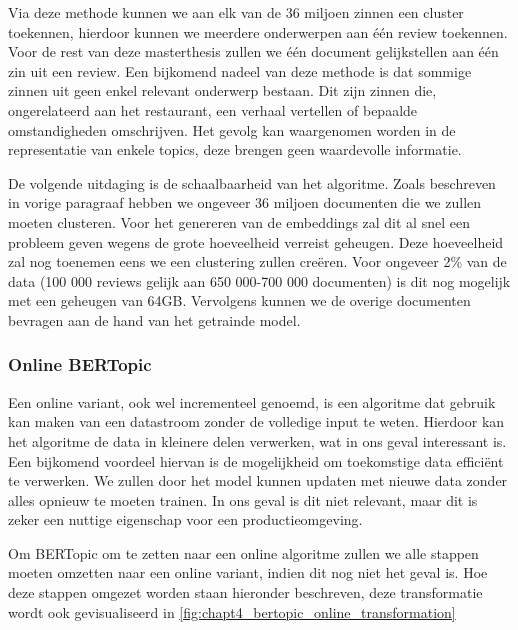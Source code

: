 Via deze methode kunnen we aan elk van de 36 miljoen zinnen een cluster toekennen, hierdoor kunnen we meerdere onderwerpen aan één review toekennen. Voor de rest van deze masterthesis zullen we één document gelijkstellen aan één zin uit een review. Een bijkomend nadeel van deze methode is dat sommige zinnen uit geen enkel relevant onderwerp bestaan. Dit zijn zinnen die, ongerelateerd aan het restaurant, een verhaal vertellen of bepaalde omstandigheden omschrijven. Het gevolg kan waargenomen worden in de representatie van enkele topics, deze brengen geen waardevolle informatie. 

De volgende uitdaging is de schaalbaarheid van het algoritme. Zoals beschreven in vorige paragraaf hebben we ongeveer 36 miljoen documenten die we zullen moeten clusteren. Voor het genereren van de embeddings zal dit al snel een probleem geven wegens de grote hoeveelheid verreist geheugen. Deze hoeveelheid zal nog toenemen eens we een clustering zullen creëren. Voor ongeveer 2\% van de data (100 000 reviews gelijk aan 650 000-700 000 documenten) is dit nog mogelijk met een geheugen van 64GB. Vervolgens kunnen we de overige documenten bevragen aan de hand van het getrainde model.

\subsubsection{Online BERTopic}
Een online variant, ook wel incrementeel genoemd, is een algoritme dat gebruik kan maken van een datastroom zonder de volledige input te weten. Hierdoor kan het algoritme de data in kleinere delen verwerken, wat in ons geval interessant is. Een bijkomend voordeel hiervan is de mogelijkheid om toekomstige data efficiënt te verwerken. We zullen door het model kunnen updaten met nieuwe data zonder alles opnieuw te moeten trainen. In ons geval is dit niet relevant, maar dit is zeker een nuttige eigenschap voor een productieomgeving.

Om BERTopic om te zetten naar een online algoritme zullen we alle stappen moeten omzetten naar een online variant, indien dit nog niet het geval is. Hoe deze stappen omgezet worden staan hieronder beschreven, deze transformatie wordt ook gevisualiseerd in \autoref{fig:chapt4_bertopic_online_transformation}

